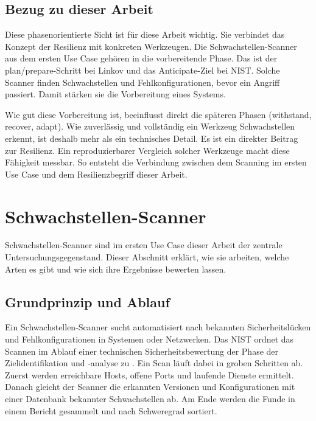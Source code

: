 \subsection{Bezug zu dieser Arbeit}
\label{subsec:resilienz-bezug}

Diese phasenorientierte Sicht ist für diese Arbeit wichtig. Sie verbindet das Konzept der Resilienz
mit konkreten Werkzeugen. Die Schwachstellen-Scanner aus dem ersten Use Case gehören in die
vorbereitende Phase. Das ist der plan/prepare-Schritt bei Linkov und das Anticipate-Ziel bei NIST.
Solche Scanner finden Schwachstellen und Fehlkonfigurationen, bevor ein Angriff passiert. Damit
stärken sie die Vorbereitung eines Systems.

Wie gut diese Vorbereitung ist, beeinflusst direkt die späteren Phasen (withstand, recover, adapt).
Wie zuverlässig und vollständig ein Werkzeug Schwachstellen erkennt, ist deshalb mehr als ein
technisches Detail. Es ist ein direkter Beitrag zur Resilienz. Ein reproduzierbarer Vergleich
solcher Werkzeuge macht diese Fähigkeit messbar. So entsteht die Verbindung zwischen dem Scanning
im ersten Use Case und dem Resilienzbegriff dieser Arbeit.

\section{Schwachstellen-Scanner}
\label{sec:vuln-scanner}

Schwachstellen-Scanner sind im ersten Use Case dieser Arbeit der zentrale
Untersuchungsgegenstand. Dieser Abschnitt erklärt, wie sie arbeiten, welche Arten es gibt und wie
sich ihre Ergebnisse bewerten lassen.

\subsection{Grundprinzip und Ablauf}
\label{subsec:scan-grundprinzip}

Ein Schwachstellen-Scanner sucht automatisiert nach bekannten Sicherheitslücken und
Fehlkonfigurationen in Systemen oder Netzwerken. Das NIST ordnet das Scannen im Ablauf einer
technischen Sicherheitsbewertung der Phase der Zielidentifikation und -analyse zu
\cite{NISTSP800115}. Ein Scan läuft dabei in groben Schritten ab. Zuerst werden erreichbare Hosts,
offene Ports und laufende Dienste ermittelt. Danach gleicht der Scanner die erkannten Versionen
und Konfigurationen mit einer Datenbank bekannter Schwachstellen ab. Am Ende werden die Funde in
einem Bericht gesammelt und nach Schweregrad sortiert.

